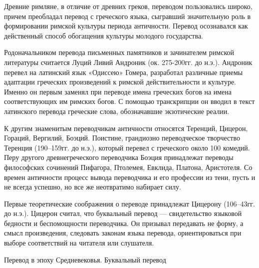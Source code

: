 Древние римляне, в отличие от древних греков, переводом пользовались широко, причем преобладал перевод с греческого языка, сыгравший значительную роль в формировании римской культуры периода античности. Перевод осознавался как действенный способ обогащения культуры молодого государства.

Родоначальником перевода письменных памятников и зачинателем римской литературы считается Луций Ливий Андроник (ок. 275-200гг. до н.э.). Андроник перевел на латинский язык «Одиссею» Гомера, разработал различные приемы адаптации греческих произведений к римской действительности и культуре. Именно он первым заменял при переводе имена греческих богов на имена соответствующих им римских богов. С помощью транскрипции он вводил в текст латинского перевода греческие слова, обозначавшие экзотические реалии.

К другим знаменитым переводчикам античности относятся Теренций, Цицерон, Гораций, Вергилий, Боэций. Поистине, грандиозно переводческое творчество Теренция (190--159гг. до н.э.), который перевел с греческого около 100 комедий. Перу другого древнегреческого переводчика Боэция принадлежат переводы философских сочинений Пифагора, Птолемея, Евклида, Платона, Аристотеля. Со времен античности процесс вывода переводчика и его профессии из тени, пусть и не всегда успешно, но все же неотвратимо набирает силу.

Первые теоретические соображения о переводе принадлежат Цицерону (106--43гг. до н.э.). Цицерон считал, что буквальный перевод --- свидетельство языковой бедности и беспомощности переводчика. Он призывал передавать не форму, а смысл произведения, следовать законам языка перевода, ориентироваться при выборе соответствий на читателя или слушателя.

Перевод в эпоху Средневековья. Буквальный перевод

